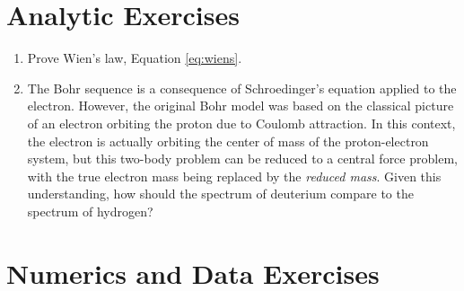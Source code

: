 \section{Analytic Exercises}

\begin{enumerate}
\item Prove Wien's law, Equation \ref{eq:wiens}.
\item The Bohr sequence is a consequence of Schroedinger's equation
  applied to the electron. However, the original Bohr model was based
  on the classical picture of an electron orbiting the proton due to
  Coulomb attraction. In this context, the electron is actually
  orbiting the center of mass of the proton-electron system, but this
  two-body problem can be reduced to a central force problem, with the
  true electron mass being replaced by the {\it reduced mass}. Given
  this understanding, how should the spectrum of deuterium compare to
  the spectrum of hydrogen?
\end{enumerate}

\section{Numerics and Data Exercises}


